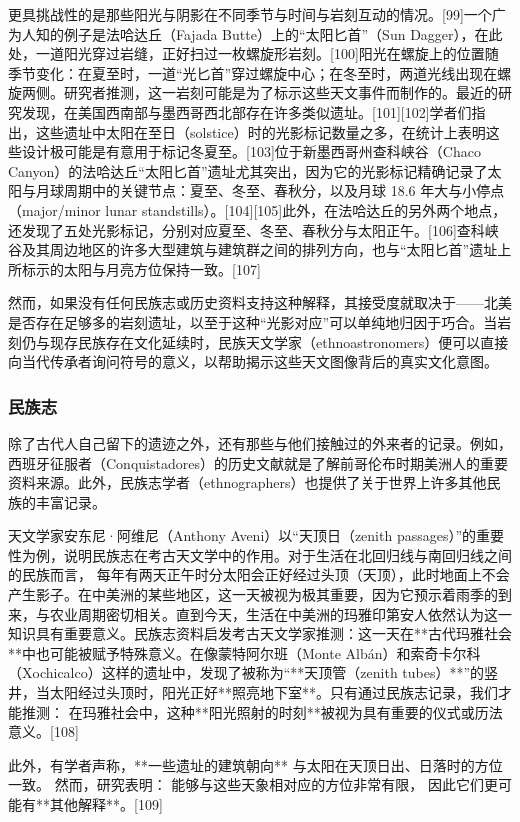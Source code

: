 更具挑战性的是那些阳光与阴影在不同季节与时间与岩刻互动的情况。[99]一个广为人知的例子是法哈达丘（Fajada Butte）上的“太阳匕首”（Sun Dagger），在此处，一道阳光穿过岩缝，正好扫过一枚螺旋形岩刻。[100]阳光在螺旋上的位置随季节变化：在夏至时，一道“光匕首”穿过螺旋中心；在冬至时，两道光线出现在螺旋两侧。研究者推测，这一岩刻可能是为了标示这些天文事件而制作的。最近的研究发现，在美国西南部与墨西哥西北部存在许多类似遗址。[101][102]学者们指出，这些遗址中太阳在至日（solstice）时的光影标记数量之多，在统计上表明这些设计极可能是有意用于标记冬夏至。[103]位于新墨西哥州查科峡谷（Chaco Canyon）的法哈达丘“太阳匕首”遗址尤其突出，因为它的光影标记精确记录了太阳与月球周期中的关键节点：夏至、冬至、春秋分，以及月球 18.6 年大与小停点（major/minor lunar standstills）。[104][105]此外，在法哈达丘的另外两个地点，还发现了五处光影标记，分别对应夏至、冬至、春秋分与太阳正午。[106]查科峡谷及其周边地区的许多大型建筑与建筑群之间的排列方向，也与“太阳匕首”遗址上所标示的太阳与月亮方位保持一致。[107]

然而，如果没有任何民族志或历史资料支持这种解释，其接受度就取决于——北美是否存在足够多的岩刻遗址，以至于这种“光影对应”可以单纯地归因于巧合。当岩刻仍与现存民族存在文化延续时，民族天文学家（ethnoastronomers）便可以直接向当代传承者询问符号的意义，以帮助揭示这些天文图像背后的真实文化意图。
\subsubsection{民族志}
除了古代人自己留下的遗迹之外，还有那些与他们接触过的外来者的记录。例如，西班牙征服者（Conquistadores）的历史文献就是了解前哥伦布时期美洲人的重要资料来源。此外，民族志学者（ethnographers）也提供了关于世界上许多其他民族的丰富记录。

天文学家安东尼·阿维尼（Anthony Aveni）以“天顶日（zenith passages）”的重要性为例，说明民族志在考古天文学中的作用。对于生活在北回归线与南回归线之间的民族而言，
每年有两天正午时分太阳会正好经过头顶（天顶），此时地面上不会产生影子。在中美洲的某些地区，这一天被视为极其重要，因为它预示着雨季的到来，与农业周期密切相关。直到今天，生活在中美洲的玛雅印第安人依然认为这一知识具有重要意义。民族志资料启发考古天文学家推测：这一天在**古代玛雅社会**中也可能被赋予特殊意义。在像蒙特阿尔班（Monte Albán）和索奇卡尔科（Xochicalco）这样的遗址中，发现了被称为“**天顶管（zenith tubes）**”的竖井，当太阳经过头顶时，阳光正好**照亮地下室**。只有通过民族志记录，我们才能推测：
在玛雅社会中，这种**阳光照射的时刻**被视为具有重要的仪式或历法意义。[108]

此外，有学者声称，**一些遗址的建筑朝向**
与太阳在天顶日出、日落时的方位一致。
然而，研究表明：
能够与这些天象相对应的方位非常有限，
因此它们更可能有**其他解释**。[109]

